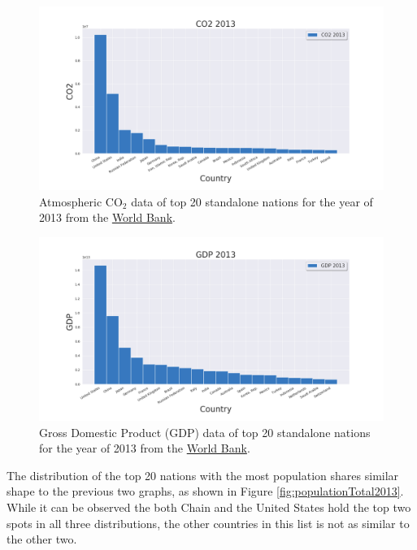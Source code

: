 \documentclass[11pt,a4paper,titlepage]{article}
\begin{document}
\begin{figure}[!htbp]
    \begin{center}
        \includegraphics[width=\textwidth]{../Plots/CO2_2013.png}
        \caption{Atmospheric CO$_{2}$ data of top 20 standalone nations for the year of 2013 from the \href{https://www.worldbank.org/}{World Bank}.}
        \label{fig:CO22013}
    \end{center}
\end{figure}

\begin{figure}[!htbp]
    \begin{center}
        \includegraphics[width=\textwidth]{../Plots/GDP_2013.png}
        \caption{Gross Domestic Product (GDP) data of top 20 standalone nations for the year of 2013 from the \href{https://www.worldbank.org/}{World Bank}.}
        \label{fig:GDP2013}
    \end{center}
\end{figure}

The distribution of the top 20 nations with the most population shares similar shape to the previous two graphs, as shown in Figure \ref{fig:populationTotal2013}. While it can be observed the both Chain and the United States hold the top two spots in all three distributions, the other countries in this list is not as similar to the other two.
\end{document}
